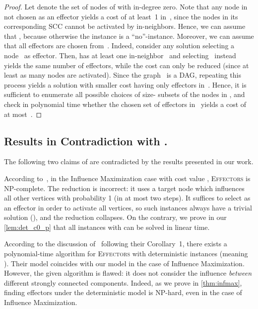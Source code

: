 \documentclass{article}
\newcommand{\probEffectors}{\textsc{Effectors}\xspace}
\begin{document}
\begin{proof}
  Let  denote the set of nodes of  with in-degree zero. 
  Note that any node in~ not chosen as an effector yields a cost of at least~1 in~, since the nodes in its corresponding SCC cannot be activated by in-neighbors.
  Hence, we can assume that , because otherwise the instance is a ``no''-instance.
  Moreover, we can assume that all effectors are chosen from~. 
  Indeed, consider any solution selecting a node~ as effector. 
  Then,  has at least one in-neighbor~ and selecting~ instead yields the same number of effectors, while the cost can only be reduced (since at least as many nodes are activated). 
  Since the graph~ is a DAG, repeating this process yields a solution with smaller cost having only effectors in~.
  Hence, it is sufficient to enumerate all possible choices of
  size- subsets of the  nodes in , 
  and check in polynomial time whether the chosen set of effectors in~
  yields a cost of at most~.  
\end{proof}



\subsection{Results in Contradiction with \citet{LTGMH10}.}\label{sect:flawDetails}
The following two claims of \citet{LTGMH10} are contradicted by the results presented in our work.

According to~\citet[Lemma 1]{LTGMH10}, in the {\sc Influence Maximization} case with cost value , 
\probEffectors is NP-complete.
The reduction is incorrect: it uses a target node  which influences all other vertices with probability 1 (in at most two steps). 
It suffices to select  as an effector in order to activate all
vertices, so such instances always have a trivial solution
(), and the reduction collapses.
On the contrary, we prove in our \autoref{lem:det_c0_p} that all instances with  can be solved in linear time. 

According to the discussion of~\citet{LTGMH10} following
their Corollary~1, there exists a polynomial-time algorithm for \probEffectors with deterministic instances (meaning ).
Their model coincides with our model in the case of 
{\sc Influence Maximization}. However, the given algorithm is flawed: it does not consider the influence 
\emph{between} different strongly connected components. Indeed, as we prove in \autoref{thm:infmax}, 
finding effectors under the deterministic model is NP-hard, even in
the case of {\sc Influence Maximization}.
\end{document}
